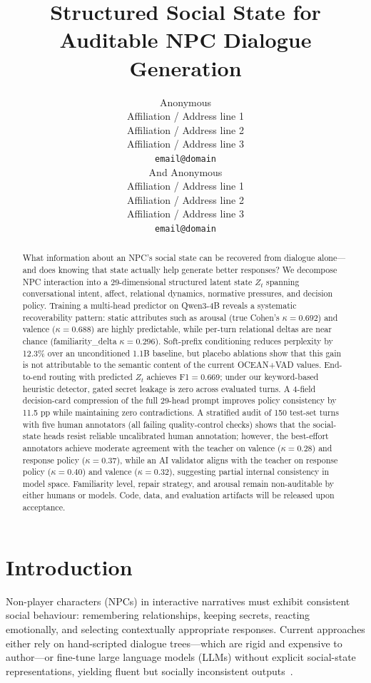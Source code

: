 \documentclass[11pt]{article}
\title{Structured Social State for Auditable NPC Dialogue Generation}
\author{Anonymous \\
  Affiliation / Address line 1 \\
  Affiliation / Address line 2 \\
  Affiliation / Address line 3 \\
  \texttt{email@domain} \\And
  Anonymous \\
  Affiliation / Address line 1 \\
  Affiliation / Address line 2 \\
  Affiliation / Address line 3 \\
  \texttt{email@domain} \\}
\begin{document}
\maketitle

\begin{abstract}
What information about an NPC's social state can be recovered from dialogue alone---and does knowing that state actually help generate better responses?
We decompose NPC interaction into a 29-dimensional structured latent state $Z_t$ spanning conversational intent, affect, relational dynamics, normative pressures, and decision policy.
Training a multi-head predictor on Qwen3-4B reveals a systematic recoverability pattern: static attributes such as arousal (true Cohen's $\kappa{=}0.692$) and valence ($\kappa{=}0.688$) are highly predictable, while per-turn relational deltas are near chance (familiarity\_delta $\kappa{=}0.296$).
Soft-prefix conditioning reduces perplexity by 12.3\% over an unconditioned 1.1B baseline, but placebo ablations show that this gain is not attributable to the semantic content of the current OCEAN+VAD values.
End-to-end routing with predicted $Z_t$ achieves F1$=$0.669; under our keyword-based heuristic detector, gated secret leakage is zero across evaluated turns. A 4-field decision-card compression of the full 29-head prompt improves policy consistency by 11.5 pp while maintaining zero contradictions.
A stratified audit of 150 test-set turns with five human annotators (all failing quality-control checks) shows that the social-state heads resist reliable uncalibrated human annotation; however, the best-effort annotators achieve moderate agreement with the teacher on valence ($\kappa{=}0.28$) and response policy ($\kappa{=}0.37$), while an AI validator aligns with the teacher on response policy ($\kappa{=}0.40$) and valence ($\kappa{=}0.32$), suggesting partial internal consistency in model space.
Familiarity level, repair strategy, and arousal remain non-auditable by either humans or models.
Code, data, and evaluation artifacts will be released upon acceptance.
\end{abstract}

\section{Introduction}
\label{sec:intro}

Non-player characters (NPCs) in interactive narratives must exhibit consistent social behaviour: remembering relationships, keeping secrets, reacting emotionally, and selecting contextually appropriate responses.
Current approaches either rely on hand-scripted dialogue trees---which are rigid and expensive to author---or fine-tune large language models (LLMs) without explicit social-state representations, yielding fluent but socially inconsistent outputs~\cite{park2023generative,wang2023voyager}.
\end{document}
